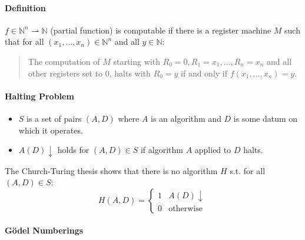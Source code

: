 \documentclass[twocolumn,english]{article}
\begin{document}
\paragraph{Definition}

$f\in\mathbb{N}^{n}\rightharpoonup\mathbb{N}$ (partial function)
is computable if there is a register machine $M$ such that for all
$\left(x_{1},\dots,x_{n}\right)\in\mathbb{N}^{n}$ and all $y\in\mathbb{N}$: 
\begin{quotation}
The computation of $M$ starting with $R_{0}=0,R_{1}=x_{1},\dots,R_{n}=x_{n}$
and all other registers set to 0, halts with $R_{0}=y$ if and only
if $f\left(x_{1},\dots,x_{n}\right)=y$. 
\end{quotation}

\paragraph{Halting Problem}
\begin{itemize}
\item $S$ is a set of pairs $\left(A,D\right)$ where $A$ is an algorithm
and $D$ is some datum on which it operates. 
\item $A\left(D\right)\downarrow$ holds for $\left(A,D\right)\in S$ if
algorithm $A$ applied to $D$ halts. 
\end{itemize}
The Church-Turing thesis shows that there is no algorithm $H$ s.t.
for all $\left(A,D\right)\in S$: 
\[
H\left(A,D\right)=\begin{cases}
1 & A\left(D\right)\downarrow\\
0 & \text{otherwise}
\end{cases}
\]



\paragraph{Gödel Numberings}
\end{document}
